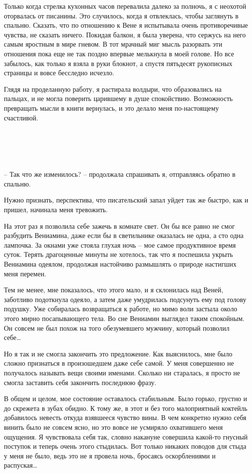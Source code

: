 \documentclass[
]{book}
\begin{document}
Только когда стрелка кухонных часов перевалила далеко за полночь, я с неохотой оторвалась от писанины. Это случилось, когда я отвлеклась, чтобы заглянуть в спальню. Сказать, что по отношению к Вене я испытывала очень противоречивые чувства, не сказать ничего. Покидая балкон, я была уверена, что сержусь на него самым яростным в мире гневом. В тот мрачный миг мысль разорвать эти отношения пока еще не так поздно впервые мелькнула в моей голове. Но все забылось, как только я взяла в руки блокнот, а спустя пятьдесят рукописных страницы и вовсе бесследно исчезло.

Глядя на проделанную работу, я растирала волдыри, что образовались на пальцах, и не могла поверить царившему в душе спокойствию. Возможность превращать мысли в книги вернулась, и это делало меня по-настоящему счастливой.

\hypertarget{chapter-58}{%
\chapter{~}\label{chapter-58}}

-- Так что же изменилось? -- продолжала спрашивать я, отправляясь обратно в спальню.

Нужно признать, перспектива, что писательский запал уйдет так же быстро, как и пришел, начинала меня тревожить.

На этот раз я позволила себе зажечь в комнате свет. Он бы все равно не смог разбудить Вениамина, даже если бы в светильнике оказалась не одна, а сто одна лампочка. За окнами уже стояла глухая ночь -- мое самое продуктивное время суток. Терять драгоценные минуты не хотелось, так что я поспешила укрыть Вениамина одеялом, продолжая настойчиво размышлять о природе настигших меня перемен.

Тем не менее, мне показалось, что этого мало, и я склонилась над Веней, заботливо подоткнула одеяло, а затем даже умудрилась подсунуть ему под голову подушку. Уже собиралась возвращаться к работе, но мимо воли застыла около этого мирно посапывающего тела. Во сне Вениамин выглядел таким спокойным. Он совсем не был похож на того обезумевшего мужчину, который позволил себе\ldots{}

Но я так и не смогла закончить это предложение. Как выяснилось, мне было сложно признаться в произошедшем даже себе самой. У меня совершенно не получалось называть вещи своими именами. Сколько ни старалась, я просто не смогла заставить себя закончить последнюю фразу.

В общем и целом, мое состояние оставалось стабильным. Было горько, грустно и до скрежета в зубах обидно. К тому же, в этот и без того малоприятный коктейль добавилось невесть откуда взявшееся чувство вины. В чем конкретно нужно себя винить было не совсем ясно, но это вовсе не усмиряло охватившего меня ощущения. Я чувствовала себя так, словно накануне совершила какой-то гнусный поступок и теперь очень этого стыдилась. Вот только никаких поводов для стыда у меня не было, ведь это не я провела ночь, бросаясь оскорблениями и распуская\ldots{}
\end{document}
